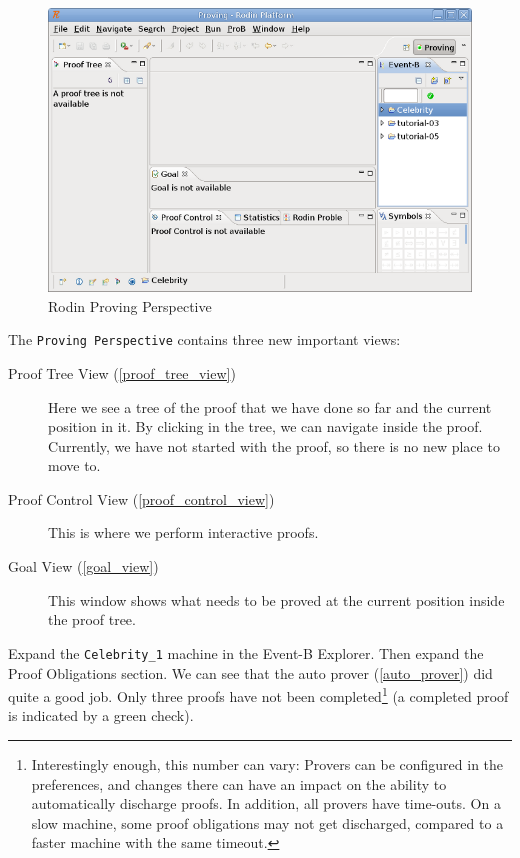\begin{figure}[!ht]
\begin{center}
	\includegraphics{img/tutorial/tut_08_proving_perspective.png}
	\caption{Rodin Proving Perspective}
	\label{fig_tut_08_proving_perspective}
\end{center}
\end{figure}

The \texttt{Proving Perspective} contains three new important views:

\begin{description}
	\item[Proof Tree View (\ref{proof_tree_view})] Here we see a tree of the proof that we have done so far and the current position in it. By clicking in the tree, we can navigate inside the proof. Currently, we have not started with the proof, so there is no new place to move to.
	\item[Proof Control View (\ref{proof_control_view})] This is where we perform interactive proofs.
	\item[Goal View (\ref{goal_view})] This window shows what needs to be proved at the current position inside the proof tree.
\end{description}

Expand the \texttt{Celebrity\_1} machine in the \textsf{Event-B Explorer}. Then expand the \textsf{Proof Obligations} section. We can see that the auto prover (\ref{auto_prover}) did quite a good job. Only three proofs have not been completed\footnote{Interestingly enough, this number can vary: Provers can be configured in the preferences, and changes there can have an impact on the ability to automatically discharge proofs.  In addition, all provers have time-outs.  On a slow machine, some proof obligations may not get discharged, compared to a faster machine with the same timeout.}  (a completed proof is indicated by a green check). 

